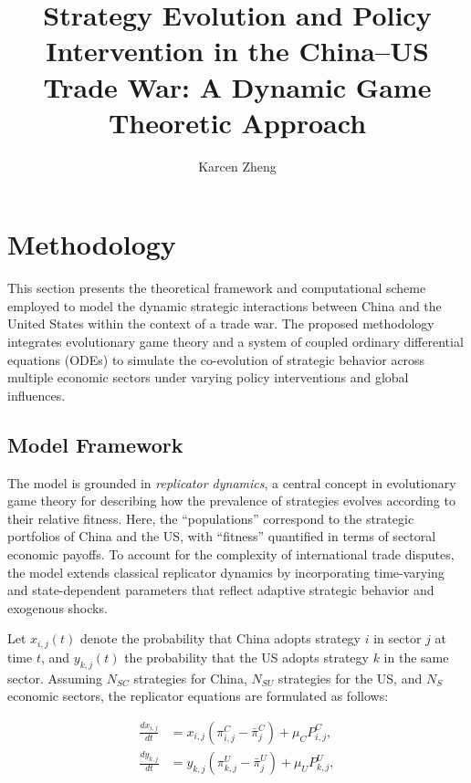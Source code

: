 \documentclass{article}
\title{Strategy Evolution and Policy Intervention in the China–US Trade War: A Dynamic Game Theoretic Approach}
\author{Karcen Zheng}
\date{}
\begin{document}
\maketitle

\section{Methodology}

This section presents the theoretical framework and computational scheme employed to model the dynamic strategic interactions between China and the United States within the context of a trade war. The proposed methodology integrates evolutionary game theory and a system of coupled ordinary differential equations (ODEs) to simulate the co-evolution of strategic behavior across multiple economic sectors under varying policy interventions and global influences.

\subsection{Model Framework}

The model is grounded in \textit{replicator dynamics}, a central concept in evolutionary game theory for describing how the prevalence of strategies evolves according to their relative fitness. Here, the “populations” correspond to the strategic portfolios of China and the US, with “fitness” quantified in terms of sectoral economic payoffs. To account for the complexity of international trade disputes, the model extends classical replicator dynamics by incorporating time-varying and state-dependent parameters that reflect adaptive strategic behavior and exogenous shocks.

Let \(x_{i,j}(t)\) denote the probability that China adopts strategy \(i\) in sector \(j\) at time \(t\), and \(y_{k,j}(t)\) the probability that the US adopts strategy \(k\) in the same sector. Assuming \(N_{SC}\) strategies for China, \(N_{SU}\) strategies for the US, and \(N_S\) economic sectors, the replicator equations are formulated as follows:

\begin{align*}
\frac{dx_{i,j}}{dt} &= x_{i,j} \left( \pi_{i,j}^C - \bar{\pi}_j^C \right) + \mu_C P_{i,j}^C, \\
\frac{dy_{k,j}}{dt} &= y_{k,j} \left( \pi_{k,j}^U - \bar{\pi}_j^U \right) + \mu_U P_{k,j}^U,
\end{align*}
\end{document}
